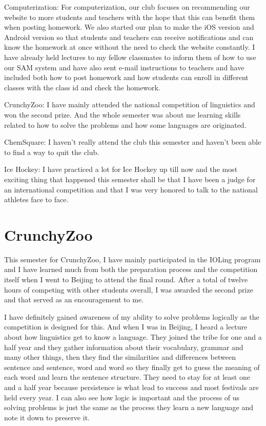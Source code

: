 \documentclass[11pt,a4paper,titlepage]{article}
\begin{document}
Computerization:
For computerization, our club focuses on recommending our website to more students and teachers with the hope that this can benefit them when posting homework. We also started our plan to make the iOS version and Android version so that students and teachers can receive notifications and can know the homework at once without the need to check the website constantly. I have already held lectures to my fellow classmates to inform them of how to use our SAM system and have also sent e-mail instructions to teachers and have included both how to post homework and how students can enroll in different classes with the class id and check the homework.

CrunchyZoo:
I have mainly attended the national competition of linguistics and won the second prize. And the whole semester was about me learning skills related to how to solve the problems and how some languages are originated. 

ChemSquare:
I haven’t really attend the club this semester and haven’t been able to find a way to quit the club.

Ice Hockey:
I have practiced a lot for Ice Hockey up till now and the most exciting thing that happened this semester shall be that I have been a judge for an international competition and that I was very honored to talk to the national athletes face to face.

\section{CrunchyZoo}
This semester for CrunchyZoo, I have mainly participated in the IOLing program and I have learned much from both the preparation process and the competition itself when I went to Beijing to attend the final round. After a total of twelve hours of competing with other students overall, I was awarded the second prize and that served as an encouragement to me.

I have definitely gained awareness of my ability to solve problems logically as the competition is designed for this. And when I was in Beijing, I heard a lecture about how linguistics get to know a language. They joined the tribe for one and a half year and they gather information about their vocabulary, grammar and many other things, then they find the similarities and differences between sentence and sentence, word and word so they finally get to guess the meaning of each word and learn the sentence structure. They need to stay for at least one and a half year because persistence is what lead to success and most festivals are held every year. I can also see how logic is important and the process of us solving problems is just the same as the process they learn a new language and note it down to preserve it.
\end{document}
